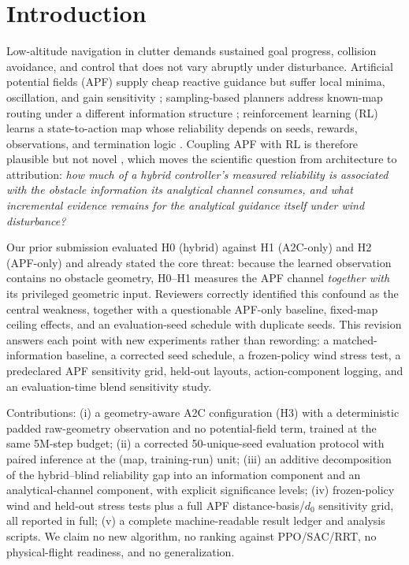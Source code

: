 \documentclass[conference]{IEEEtran}
\begin{document}
\section{Introduction}
Low-altitude navigation in clutter demands sustained goal progress, collision avoidance, and control that does
not vary abruptly under disturbance. Artificial potential fields (APF) supply cheap reactive guidance but suffer
local minima, oscillation, and gain sensitivity \cite{khatib1986real}; sampling-based planners address known-map
routing under a different information structure \cite{lavalle1998rrt,karaman2011sampling}; reinforcement learning
(RL) learns a state-to-action map whose reliability depends on seeds, rewards, observations, and termination
logic \cite{henderson2018deep,dulac2021challenges}. Coupling APF with RL is therefore plausible but not novel
\cite{jin2025hybrid,xiao2025vapf,lee2025apfppo}, which moves the scientific question from architecture to
attribution: \emph{how much of a hybrid controller's measured reliability is associated with the obstacle
information its analytical channel consumes, and what incremental evidence remains for the analytical guidance
itself under wind disturbance?}

Our prior submission evaluated H0 (hybrid) against H1 (A2C-only) and H2 (APF-only) and already stated the core
threat: because the learned observation contains no obstacle geometry, H0--H1 measures the APF channel
\emph{together with} its privileged geometric input. Reviewers correctly identified this confound as the central
weakness, together with a questionable APF-only baseline, fixed-map ceiling effects, and an evaluation-seed
schedule with duplicate seeds. This revision answers each point with new experiments rather than rewording:
a matched-information baseline, a corrected seed schedule, a frozen-policy wind stress test, a predeclared APF
sensitivity grid, held-out layouts, action-component logging, and an evaluation-time blend sensitivity study.

Contributions: (i) a geometry-aware A2C configuration (H3) with a deterministic padded raw-geometry observation
and no potential-field term, trained at the same 5M-step budget; (ii) a corrected 50-unique-seed evaluation
protocol with paired inference at the (map, training-run) unit; (iii) an additive decomposition of the
hybrid--blind reliability gap into an information component and an analytical-channel component, with explicit
significance levels; (iv) frozen-policy wind and held-out stress tests plus a full APF distance-basis/$d_0$
sensitivity grid, all reported in full; (v) a complete machine-readable result ledger and analysis scripts.
We claim no new algorithm, no ranking against PPO/SAC/RRT, no physical-flight readiness, and no generalization.
\end{document}
